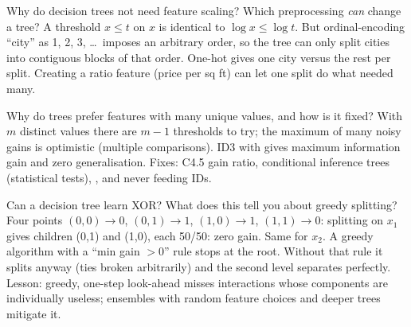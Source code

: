 \begin{qa}{\deep Why do decision trees not need feature scaling? Which preprocessing \emph{can} change a tree?}
\why A threshold $x\le t$ on $x$ is identical to $\log x \le \log t$. But ordinal-encoding ``city'' as 1, 2, 3, \dots\ imposes an
arbitrary order, so the tree can only split cities into contiguous blocks of that order. One-hot gives one city versus the rest per
split. Creating a ratio feature (price per sq ft) can let one split do what needed many.
\end{qa}

\begin{qa}{Why do trees prefer features with many unique values, and how is it fixed?}
\why With $m$ distinct values there are $m-1$ thresholds to try; the maximum of many noisy gains is optimistic (multiple comparisons).
ID3 with  gives maximum information gain and zero generalisation. Fixes: C4.5 gain ratio, conditional inference
trees (statistical tests), , and never feeding IDs.
\end{qa}

\begin{qa}{\deep Can a decision tree learn XOR? What does this tell you about greedy splitting?}
\why Four points $(0,0)\to0$, $(0,1)\to1$, $(1,0)\to1$, $(1,1)\to0$: splitting on $x_1$ gives children (0,1) and (1,0), each
50/50: zero gain. Same for $x_2$. A greedy algorithm with a ``min gain $> 0$'' rule stops at the root. Without that rule it splits
anyway (ties broken arbitrarily) and the second level separates perfectly. Lesson: greedy, one-step look-ahead misses
interactions whose components are individually useless; ensembles with random feature choices and deeper trees mitigate it.
\end{qa}

